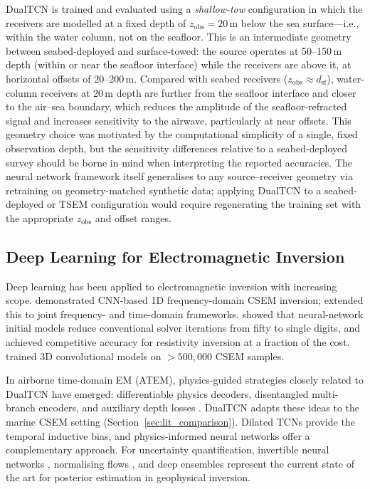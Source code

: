 \documentclass[journal]{IEEEtran}
\begin{document}
DualTCN is trained and evaluated using a \emph{shallow-tow}
configuration in which the receivers are modelled at a fixed depth of
$z_\mathrm{obs} = 20$\,m below the sea surface---i.e., within the
water column, not on the seafloor.  This is an intermediate geometry
between seabed-deployed and surface-towed: the source operates at
50--150\,m depth (within or near the seafloor interface) while the
receivers are above it, at horizontal offsets of 20--200\,m.
Compared with seabed receivers ($z_\mathrm{obs} \approx
d_\mathrm{sf}$), water-column receivers at 20\,m depth are further
from the seafloor interface and closer to the air--sea boundary,
which reduces the amplitude of the seafloor-refracted signal and
increases sensitivity to the airwave, particularly at near offsets.
This geometry choice was motivated by the computational simplicity
of a single, fixed observation depth, but the sensitivity differences
relative to a seabed-deployed survey should be borne in mind when
interpreting the reported accuracies.  The neural network framework
itself generalises to any source--receiver geometry via retraining on
geometry-matched synthetic data; applying DualTCN to a seabed-deployed
or TSEM configuration would require regenerating the training set with
the appropriate $z_\mathrm{obs}$ and offset ranges.

\subsection{Deep Learning for Electromagnetic Inversion}

Deep learning has been applied to electromagnetic inversion with
increasing scope.  \citet{puzyrev2019deep} demonstrated CNN-based
1D frequency-domain CSEM inversion; \citet{puzyrev2021multi}
extended this to joint frequency- and time-domain frameworks.
\citet{araya2018deep} showed that neural-network initial models
reduce conventional solver iterations from fifty to single digits,
and \citet{liu2020deep} achieved competitive accuracy for resistivity
inversion at a fraction of the cost.  \citet{zhang2024_3d} trained
3D convolutional models on $> 500{,}000$ CSEM samples.

In airborne time-domain EM (ATEM), physics-guided strategies closely
related to DualTCN have emerged: differentiable physics decoders,
disentangled multi-branch encoders, and auxiliary depth losses
\citep{moghadas2020deep, liu2021atem, colombo2021deep}.
DualTCN adapts these ideas to the marine CSEM setting
(Section~\ref{sec:lit_comparison}).  Dilated TCNs
\citep{bai2018empirical} provide the temporal inductive bias, and
physics-informed neural networks \citep{raissi2019physics} offer a
complementary approach.  For uncertainty quantification, invertible
neural networks \citep{ardizzone2019inn}, normalising flows
\citep{papamakarios2021normalizing, bloem2023posterior}, and deep
ensembles \citep{lakshminarayanan2017} represent the current state
of the art for posterior estimation in geophysical inversion.
\end{document}
